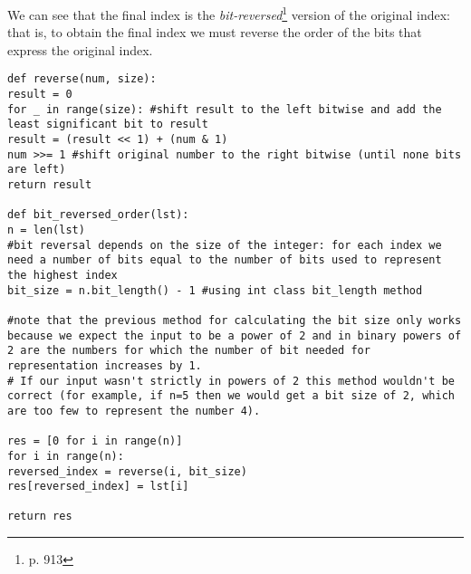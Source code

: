 \documentclass[class=article,crop=false]{standalone}
\begin{document}
We can see that the final index is the \textit{bit-reversed}\footnote{\cite{introalgo} p. 913} version of the original index: that is, to obtain the final index we must reverse the order of the bits that express the original index.
\begin{verbatim}
def reverse(num, size):
result = 0
for _ in range(size): #shift result to the left bitwise and add the least significant bit to result
result = (result << 1) + (num & 1)
num >>= 1 #shift original number to the right bitwise (until none bits are left)
return result

def bit_reversed_order(lst):
n = len(lst)
#bit reversal depends on the size of the integer: for each index we need a number of bits equal to the number of bits used to represent the highest index
bit_size = n.bit_length() - 1 #using int class bit_length method

#note that the previous method for calculating the bit size only works because we expect the input to be a power of 2 and in binary powers of 2 are the numbers for which the number of bit needed for representation increases by 1. 
# If our input wasn't strictly in powers of 2 this method wouldn't be correct (for example, if n=5 then we would get a bit size of 2, which are too few to represent the number 4).

res = [0 for i in range(n)]
for i in range(n):
reversed_index = reverse(i, bit_size)
res[reversed_index] = lst[i]

return res
\end{verbatim}
\end{document}
